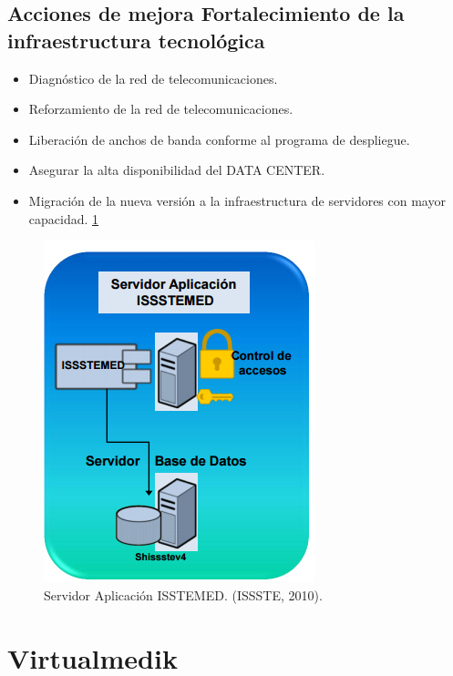 \subsection{Acciones de mejora Fortalecimiento de la infraestructura tecnológica }
\begin{itemize}
  \item Diagnóstico de la red de telecomunicaciones.
  \item Reforzamiento de la red de telecomunicaciones.
  \item Liberación de anchos de banda conforme al programa de despliegue.
  \item Asegurar la alta disponibilidad del DATA CENTER.
  \item Migración de la nueva versión a la infraestructura de servidores con mayor capacidad. \ref{figura1}


\end{itemize}

\begin{figure}[h]
  \centering
  \label{figura1}
  \includegraphics[scale=.35]{lib/assets/1}
  \caption{Servidor Aplicación ISSTEMED. (ISSSTE, 2010).}
\end{figure}






\section{Virtualmedik}

